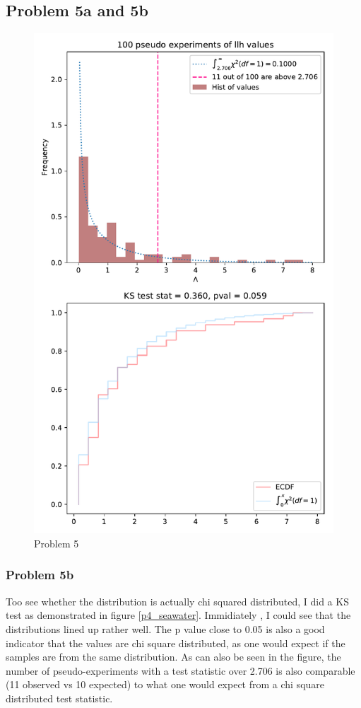 \documentclass[a4paper,11pt]{article}
\begin{document}
\subsection{Problem 5a and 5b}
\begin{figure}[H]
  \includegraphics[width=\linewidth]{../p5_llhratios}
  \caption{Problem 5}
  \label{p5_llhratios}
\end{figure}

\subsubsection{Problem 5b}
Too see whether the distribution is actually chi squared distributed, I did a KS test as demonstrated in figure \ref{p4_seawater}.
Immidiately , I could see that the distributions lined up rather well.
The p value close to 0.05 is also a good indicator that the values are chi square distributed, as one would expect if the samples are from the same distribution.
As can also be seen in the figure, the number of pseudo-experiments with a test statistic over 2.706 is also comparable (11 observed vs 10 expected) to what one would expect from a chi square distributed test statistic.
\end{document}

